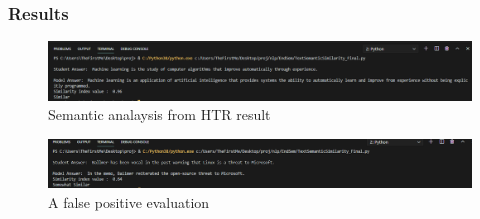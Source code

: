 \begin{frame}
    \frametitle{Results}
    \begin{figure}[!htb]
        \centering
        \includegraphics[scale=0.35]{images/nlp-1.png}
        \caption{Semantic analaysis from HTR result}
        \label{nlp1}
    \end{figure}

    \begin{figure}[!htb]
        \centering
        \includegraphics[scale=0.35]{images/nlp-2.png}
        \caption{A false positive evaluation}
        \label{nlp2}
    \end{figure}
    
\end{frame}